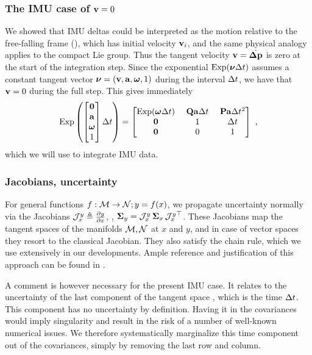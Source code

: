\subsubsection{The IMU case of \texorpdfstring{${\bf v}=0$}{bfv=0}}
\label{sec:IMU_case}

We showed that IMU deltas could be interpreted as the motion relative to the free-falling frame (), which has initial velocity ${\bf v}_i$, and the same physical analogy applies to the compact Lie group.
Thus the tangent velocity ${\bf v}=\dot{{\bm \Delta {\bf p}}}$  is zero at the start of the integration step. 
%
Since the exponential $\operatorname*{Exp}(\bm\nu\Delta t)$ assumes a constant tangent vector $\bm\nu=({\bf v},{\bf a},{{\bm \omega}},1)$ during the interval $\Delta t$, we have that ${\bf v}=0$ during the full step. 
%
This gives immediately
%
\begin{equation}
    \operatorname*{Exp}\left(\begin{bmatrix}
    \bf0 \\ {\bf a} \\ {{\bm \omega}} \\ 1
    \end{bmatrix}\Delta t\right) 
    = \begin{bmatrix}
    \operatorname*{Exp}({{\bm \omega}}\Delta t) & ~{\bf Q}{\bf a}\Delta t~ & {\bf P}{\bf a}\Delta t^2 \\
    \bf0 & 1 & \Delta t \\
    \bf0 & 0 & 1
    \end{bmatrix}
    ~,
    \label{eq:exp_compact_imu}
\end{equation}
%
which we will use to integrate IMU data.


\subsubsection{Jacobians, uncertainty}
\label{sec:uncertainty}

For general functions $f:\mathcal{M}\to\mathcal{N};y=f(x)$, we propagate uncertainty normally via the Jacobians 
${\mathcal{J}^{y}_{x}}\triangleq\frac{\partial y}{\partial x}$, \ie, ${\bm \Sigma}_y={\mathcal{J}^{y}_{x}}\,{\bm \Sigma}_x\,{\mathcal{J}^{y}_{x}}^{\top}$. 
These Jacobians map the tangent spaces of the manifolds $\mathcal{M},\mathcal{N}$ at $x$ and $y$, and in case of vector spaces they resort to the classical Jacobian.
They also satisfy the chain rule, which we use extensively in our developments.
Ample reference and justification of this approach can be found in \cite{sola2018micro}.

A comment is however necessary for the present IMU case.
It relates to the uncertainty of the last component of the tangent space , which is the time $\Delta t$. This component has no uncertainty by definition. 
Having it in the covariances would imply singularity and result in the risk of a number of well-known numerical issues. 
We therefore systematically marginalize this time component out of the covariances, simply by removing the last row and column. 






